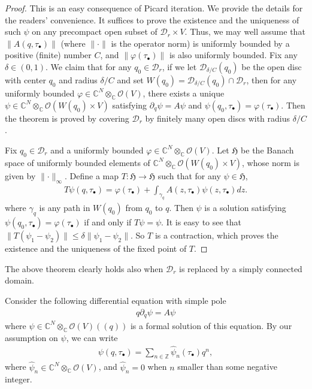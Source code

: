 \documentclass[12pt,a4paper,notitlepage]{report}
\theoremstyle{definition}
\theoremstyle{plain}
\newcommand{\fk}{\mathfrak}
\newcommand{\mc}{\mathcal}
\newcommand{\wht}{\widehat}
\newcommand{\scr}{\mathscr}
\newcommand{\mbb}{\mathbb}
\newcommand{\blt}{\bullet}
\newcommand{\Cbb}{\mathbb C}
\numberwithin{equation}{section}
\begin{document}
\begin{proof}
This is an easy consequence of Picard iteration. We provide the details for the readers' convenience. It suffices to prove the existence and the uniqueness of such $\psi$ on any precompact open subset of $\mc D_r\times V$. Thus, we may well assume that $\lVert A(q,\tau_\blt)\lVert$ (where $\lVert\cdot\lVert$ is the operator norm) is uniformly bounded by a positive (finite) number $C$, and $\lVert \varphi(\tau_\blt)\lVert$ is also uniformly bounded. Fix any $\delta\in(0,1)$. We claim that for any $q_0\in \mc D_r$, if we let $\mc D_{\delta/C}(q_0)$ be the open disc with center $q_0$ and radius $\delta/C$ and set $W(q_0)=\mc D_{\delta/C}(q_0)\cap\mc D_r$, then for any uniformly bounded $\varphi\in\Cbb^N\otimes_\Cbb\scr O(V)$, there exists a unique $\psi\in\Cbb^N\otimes_\Cbb\scr O(W(q_0)\times V)$ satisfying $\partial_q\psi=A\psi$ and $\psi(q_0,\tau_\blt)=\varphi(\tau_\blt)$. Then the theorem is proved by covering $\mc D_r$ by finitely many open discs with radius $\delta/C$.

Fix $q_0\in\mc D_r$ and a uniformly bounded $\varphi\in\Cbb^N\otimes_\Cbb\scr O(V)$. Let $\fk H$ be the Banach space of uniformly bounded elements of $\Cbb^N\otimes_\Cbb\scr O(W(q_0)\times V)$, whose norm is given by $\lVert \cdot\lVert_\infty$. Define a map $T:\fk H\rightarrow\fk H$ such that for any $\psi\in\fk H$,
\begin{align*}
T\psi(q,\tau_\blt)=\varphi(\tau_\blt)+\int_{\gamma_q} A(z,\tau_\blt)\psi(z,\tau_\blt)dz.
\end{align*}
where $\gamma_q$ is any path in $W(q_0)$ from $q_0$ to $q$. Then  $\psi$ is a solution satisfying $\psi(q_0,\tau_\blt)=\varphi(\tau_\blt)$ if and only if $T\psi=\psi$. It is easy to see that $\lVert T(\psi_1-\psi_2)\lVert\leq\delta \lVert \psi_1-\psi_2\lVert$. So $T$ is a contraction, which proves the existence and the uniqueness of the fixed point of $T$.
\end{proof}

The above theorem clearly holds also when $\mc D_r$ is replaced by a simply connected domain. 





Consider the following  differential equation with simple pole
\begin{align}
q\partial_q\psi=A\psi\label{eq27}
\end{align}
where $\psi\in\Cbb^N\otimes_\Cbb\scr O(V)((q))$ is a formal solution of this equation. By our assumption on $\psi$, we can write 
\begin{align}
\psi(q,\tau_\blt)=\sum_{n\in\mbb Z}\wht\psi_n(\tau_\blt)q^n,\label{eq24}
\end{align}
where $\wht\psi_n\in\Cbb^N\otimes_\Cbb\scr O(V)$, and  $\wht\psi_n=0$ when $n$ smaller than some  negative integer.
\end{document}
